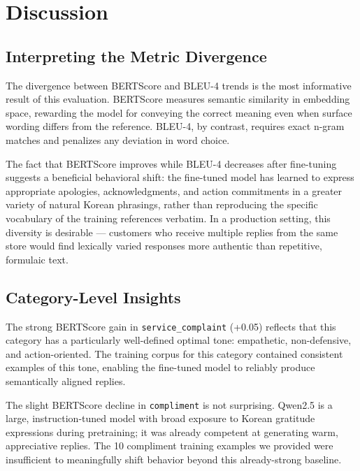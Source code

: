 \documentclass[conference]{IEEEtran}
\begin{document}
\section{Discussion}
\label{sec:discussion}

\subsection{Interpreting the Metric Divergence}

The divergence between BERTScore and BLEU-4 trends is the most
informative result of this evaluation.
BERTScore measures semantic similarity in embedding space, rewarding
the model for conveying the correct meaning even when surface wording
differs from the reference.
BLEU-4, by contrast, requires exact n-gram matches and penalizes any
deviation in word choice.

The fact that BERTScore improves while BLEU-4 decreases after
fine-tuning suggests a beneficial behavioral shift: the fine-tuned
model has learned to express appropriate apologies, acknowledgments,
and action commitments in a greater variety of natural Korean
phrasings, rather than reproducing the specific vocabulary of the
training references verbatim.
In a production setting, this diversity is desirable — customers who
receive multiple replies from the same store would find lexically
varied responses more authentic than repetitive, formulaic text.

\subsection{Category-Level Insights}

The strong BERTScore gain in \texttt{service\_complaint} (+0.05)
reflects that this category has a particularly well-defined optimal
tone: empathetic, non-defensive, and action-oriented.
The training corpus for this category contained consistent examples of
this tone, enabling the fine-tuned model to reliably produce
semantically aligned replies.

The slight BERTScore decline in \texttt{compliment} is not surprising.
Qwen2.5 is a large, instruction-tuned model with broad exposure to
Korean gratitude expressions during pretraining; it was already
competent at generating warm, appreciative replies.
The 10 compliment training examples we provided were insufficient to
meaningfully shift behavior beyond this already-strong baseline.
\end{document}
